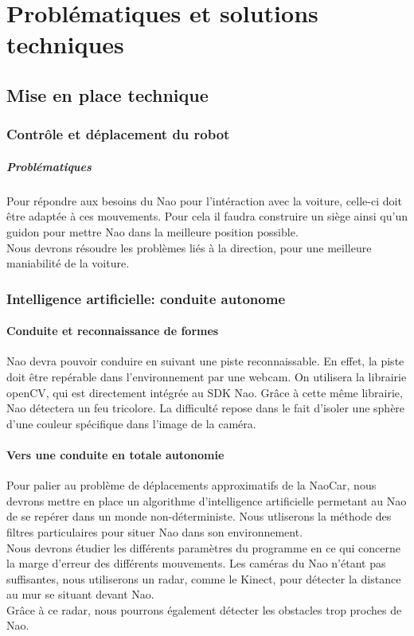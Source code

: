 \documentclass[11pt]{report} %
\begin{document}
\chapter{Problématiques et solutions techniques}
	\section{Mise en place technique}
		\subsection{Contrôle et déplacement du robot}
			\paragraph{Problématiques}
				Pour répondre aux besoins du Nao pour l'intéraction avec la voiture, celle-ci doit être adaptée à ces mouvements. Pour cela il faudra construire un siège ainsi qu'un guidon pour mettre Nao dans la meilleure position possible.\\
				Nous devrons résoudre les problèmes liés à la direction, pour une meilleure maniabilité de la voiture.
		\subsection{Intelligence artificielle: conduite autonome}
			\subsubsection{Conduite et reconnaissance de formes}
				Nao devra pouvoir conduire en suivant une piste reconnaissable. En effet, la piste doit être repérable dans l'environnement par une webcam. On utilisera la librairie openCV, qui est directement intégrée au SDK Nao. Grâce à cette même librairie, Nao détectera un feu tricolore. La difficulté repose dans le fait d'isoler une sphère d'une couleur spécifique dans l'image de la caméra.
			\subsubsection{Vers une conduite en totale autonomie}
				Pour palier au problème de déplacements approximatifs de la NaoCar, nous devrons mettre en place un algorithme d'intelligence artificielle permetant au Nao de se repérer dans un monde non-déterministe. Nous utliserons la méthode des filtres particulaires pour situer Nao dans son environnement. \\ Nous devrons étudier les différents paramètres du programme en ce qui concerne la marge d'erreur des différents mouvements. Les caméras du Nao n'étant pas suffisantes, nous utiliserons un radar, comme le Kinect, pour détecter la distance au mur se situant devant Nao.\\
Grâce à ce radar, nous pourrons également détecter les obstacles trop proches de Nao.
\end{document}
